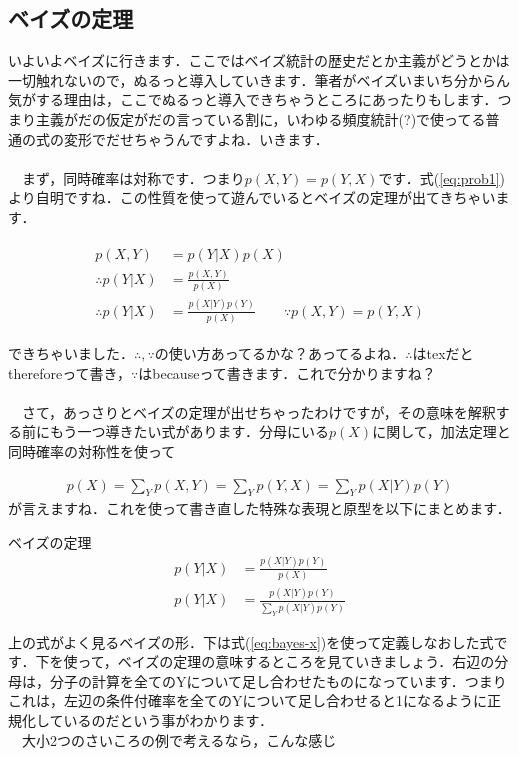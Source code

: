 \documentclass[11pt,a4paper]{jsarticle}                    %
\begin{document}
\subsection{ベイズの定理}
いよいよベイズに行きます．ここではベイズ統計の歴史だとか主義がどうとかは一切触れないので，ぬるっと導入していきます．筆者がベイズいまいち分からん気がする理由は，ここでぬるっと導入できちゃうところにあったりもします．つまり主義がだの仮定がだの言っている割に，いわゆる頻度統計(?)で使ってる普通の式の変形でだせちゃうんですよね．いきます．\\
\\
　まず，同時確率は対称です．つまり$p(X,Y) = p(Y,X)$です．式(\ref{eq:prob1})より自明ですね．この性質を使って遊んでいるとベイズの定理が出てきちゃいます．

\begin{eqnarray}
\label{eq:bayes}
\begin{split}
p(X, Y) &= p(Y|X)p(X)　\\
\therefore p(Y|X) &= \frac{p(X,Y)}{p(X)}  \\
\therefore p(Y|X) &= \frac{p(X|Y)p(Y)}{p(X)} \qquad \because p(X,Y) = p(Y, X)
\end{split}
\end{eqnarray}

できちゃいました．$\therefore, \because$の使い方あってるかな？あってるよね．$\therefore$はtexだとthereforeって書き，$\because$はbecauseって書きます．これで分かりますね？\\
\\
　さて，あっさりとベイズの定理が出せちゃったわけですが，その意味を解釈する前にもう一つ導きたい式があります．分母にいる$p(X)$に関して，加法定理と同時確率の対称性を使って

\begin{eqnarray}
\label{eq:bayes-x}
p(X) = \sum_Y p(X,Y) = \sum_Y p(Y,X) = \sum_Y p(X|Y)p(Y)
\end{eqnarray}
が言えますね．これを使って書き直した特殊な表現と原型を以下にまとめます．

\begin{screen}
ベイズの定理
\begin{eqnarray}
p(Y|X) &= \frac{p(X|Y)p(Y)}{p(X)}\\
p(Y|X) &= \frac{p(X|Y)p(Y)}{\sum_Y p(X|Y)p(Y)}
\end{eqnarray}
\end{screen}

上の式がよく見るベイズの形．下は式(\ref{eq:bayes-x})を使って定義しなおした式です．下を使って，ベイズの定理の意味するところを見ていきましょう．右辺の分母は，分子の計算を全てのYについて足し合わせたものになっています．つまりこれは，左辺の条件付確率を全てのYについて足し合わせると1になるように正規化しているのだという事がわかります．\\
　大小2つのさいころの例で考えるなら，こんな感じ
\end{document}
